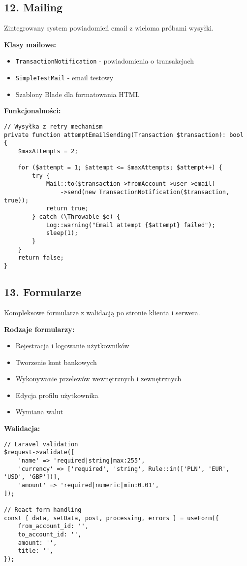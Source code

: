 \subsection{12. Mailing}

Zintegrowany system powiadomień email z wieloma próbami wysyłki.

\textbf{Klasy mailowe:}
\begin{itemize}
    \item \texttt{TransactionNotification} - powiadomienia o transakcjach
    \item \texttt{SimpleTestMail} - email testowy
    \item Szablony Blade dla formatowania HTML
\end{itemize}

\textbf{Funkcjonalności:}
\begin{verbatim}
// Wysyłka z retry mechanism
private function attemptEmailSending(Transaction $transaction): bool
{
    $maxAttempts = 2;

    for ($attempt = 1; $attempt <= $maxAttempts; $attempt++) {
        try {
            Mail::to($transaction->fromAccount->user->email)
                ->send(new TransactionNotification($transaction, true));
            return true;
        } catch (\Throwable $e) {
            Log::warning("Email attempt {$attempt} failed");
            sleep(1);
        }
    }
    return false;
}
\end{verbatim}

\subsection{13. Formularze}

Kompleksowe formularze z walidacją po stronie klienta i serwera.

\textbf{Rodzaje formularzy:}
\begin{itemize}
    \item Rejestracja i logowanie użytkowników
    \item Tworzenie kont bankowych
    \item Wykonywanie przelewów wewnętrznych i zewnętrznych
    \item Edycja profilu użytkownika
    \item Wymiana walut
\end{itemize}

\textbf{Walidacja:}
\begin{verbatim}
// Laravel validation
$request->validate([
    'name' => 'required|string|max:255',
    'currency' => ['required', 'string', Rule::in(['PLN', 'EUR', 'USD', 'GBP'])],
    'amount' => 'required|numeric|min:0.01',
]);

// React form handling
const { data, setData, post, processing, errors } = useForm({
    from_account_id: '',
    to_account_id: '',
    amount: '',
    title: '',
});
\end{verbatim}

